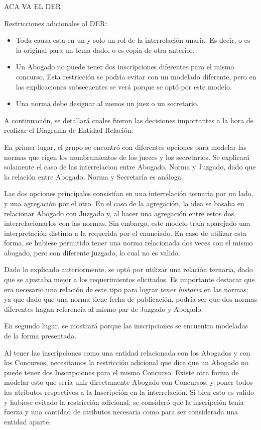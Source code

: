 
ACA VA EL DER

Restricciones adicionales al DER:

\begin{itemize}
\item Toda causa esta en un y solo un rol de la interrelación unaria. Es decir, o es la original para un tema dado, o es copia de otra anterior.
\item Un Abogado no puede tener dos inscripciones diferentes para el mismo concurso. Esta restricción se podría evitar con un modelado diferente, pero en las explicaciones subsecuentes se verá porque se optó por este modelo.
\item Una norma debe designar al menos un juez o un secretario.
\end{itemize}



A continuación, se detallará cuales fueron las decisiones importantes a la hora de realizar el Diagrama de Entidad Relación:


En primer lugar, el grupo se encontró con diferentes opciones para modelar las normas que rigen los nombramientos de los jueces y los secretarios. 
Se explicará solamente el caso de las interrelacion entre Abogado, Norma y Juzgado, dado que la relación entre Abogado, Norma y Secretaría es análoga.

Las dos opciones principales consistían en una interrelación ternaria por un lado, y una agregación por el otro.
En el caso de la agregación, la idea se basaba en relacionar Abogado con Juzgado y, al hacer una agregación entre estos dos, interrelacionarlos con las normas. Sin embargo, este modelo traía aparejado una interpretación distinta a la requerida por el enunciado. En caso de utilizar esta forma, se hubiese permitido tener una norma relacionada dos veces con el mismo abogado, pero con diferente juzgado, lo cual no es valido. 

Dado lo explicado anteriormente, se optó por utilizar una relación ternaria, dado que se ajustaba mejor a los requerimientos elicitados. 
Es importante destacar que era necesario una relación de este tipo para lograr \emph{tener historia} en las normas; ya que dado que una norma tiene fecha de publicación, podría ser que dos normas diferentes hagan referencia al mismo par de Juzgado y Abogado.


\bigskip

En segundo lugar, se mostrará porque las inscripciones se encuentra modeladas de la forma presentada. 

Al tener las inscripciones como una entidad relacionada con los Abogados y con los Concursos, necesitamos la restricción adicional que dice que un Abogado no puede tener dos Inscripciones para el mismo Concurso. Existe otra forma de modelar esto que sería unir directamente Abogado con Concursos, y poner todos los atributos respectivos a la Inscripción en la interrelación. Si bien esto es valido y hubiese evitado la restricción adicional, se consideró que la inscripción tenia fuerza y una cantidad de atributos necesaria como para ser considerada una entidad aparte.

